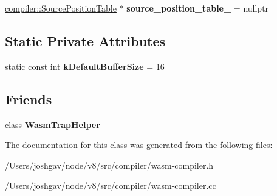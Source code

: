 \begin{DoxyCompactItemize}
\item 
\hyperlink{classv8_1_1internal_1_1compiler_1_1_source_position_table}{compiler\+::\+Source\+Position\+Table} $\ast$ {\bfseries source\+\_\+position\+\_\+table\+\_\+} = nullptr\hypertarget{classv8_1_1internal_1_1compiler_1_1_wasm_graph_builder_a2c5ab810c5ade2bb2ef605534f5905d7}{}\label{classv8_1_1internal_1_1compiler_1_1_wasm_graph_builder_a2c5ab810c5ade2bb2ef605534f5905d7}

\end{DoxyCompactItemize}
\subsection*{Static Private Attributes}
\begin{DoxyCompactItemize}
\item 
static const int {\bfseries k\+Default\+Buffer\+Size} = 16\hypertarget{classv8_1_1internal_1_1compiler_1_1_wasm_graph_builder_a8fc35ec886696b4ffc28d148774592c3}{}\label{classv8_1_1internal_1_1compiler_1_1_wasm_graph_builder_a8fc35ec886696b4ffc28d148774592c3}

\end{DoxyCompactItemize}
\subsection*{Friends}
\begin{DoxyCompactItemize}
\item 
class {\bfseries Wasm\+Trap\+Helper}\hypertarget{classv8_1_1internal_1_1compiler_1_1_wasm_graph_builder_a50718211082f11ce0b54867e5950b84e}{}\label{classv8_1_1internal_1_1compiler_1_1_wasm_graph_builder_a50718211082f11ce0b54867e5950b84e}

\end{DoxyCompactItemize}


The documentation for this class was generated from the following files\+:\begin{DoxyCompactItemize}
\item 
/\+Users/joshgav/node/v8/src/compiler/wasm-\/compiler.\+h\item 
/\+Users/joshgav/node/v8/src/compiler/wasm-\/compiler.\+cc\end{DoxyCompactItemize}
